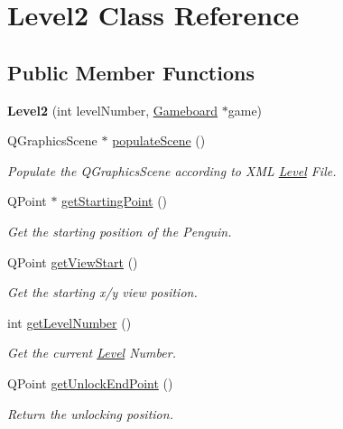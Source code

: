 \hypertarget{class_level2}{}\section{Level2 Class Reference}
\label{class_level2}
\subsection*{Public Member Functions}
\begin{DoxyCompactItemize}
\item 
\hypertarget{class_level2_a245cab1175dfdb4b3561a7317e05ebd1}{}{\bfseries Level2} (int level\+Number, \hyperlink{class_gameboard}{Gameboard} $\ast$game)\label{class_level2_a245cab1175dfdb4b3561a7317e05ebd1}

\item 
Q\+Graphics\+Scene $\ast$ \hyperlink{class_level2_a3429efd969734df0725bda5a0ef31bb3}{populate\+Scene} ()
\begin{DoxyCompactList}\small\item\em Populate the Q\+Graphics\+Scene according to X\+M\+L \hyperlink{class_level}{Level} File. \end{DoxyCompactList}\item 
Q\+Point $\ast$ \hyperlink{class_level2_aa2117b86b6ba46bc91fa6bdbb0cfb058}{get\+Starting\+Point} ()
\begin{DoxyCompactList}\small\item\em Get the starting position of the Penguin. \end{DoxyCompactList}\item 
Q\+Point \hyperlink{class_level2_ae00d67c53b25def82750bad0e296d1ef}{get\+View\+Start} ()
\begin{DoxyCompactList}\small\item\em Get the starting x/y view position. \end{DoxyCompactList}\item 
int \hyperlink{class_level2_afc7097e892ccfb17fcc8846c9fda4910}{get\+Level\+Number} ()
\begin{DoxyCompactList}\small\item\em Get the current \hyperlink{class_level}{Level} Number. \end{DoxyCompactList}\item 
Q\+Point \hyperlink{class_level2_a7e8c1628b703886e61a00f755dc2038b}{get\+Unlock\+End\+Point} ()
\begin{DoxyCompactList}\small\item\em Return the unlocking position. \end{DoxyCompactList}\item 

\end{DoxyCompactItemize}
